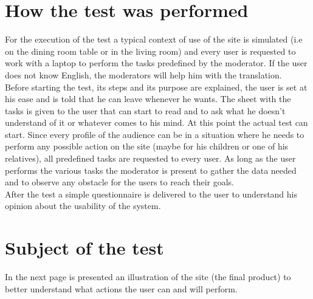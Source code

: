 \section{How the test was performed}
For the execution of the test a typical context of use of the site is simulated (i.e on the dining room table or in the living room) and every user is requested to work with a laptop to perform the tasks predefined by the moderator.
If the user does not know English, the moderators will help him with the translation.\\
Before starting the test, its steps and its purpose are explained, the user is set at his ease and is told that he can leave whenever he wants.
The sheet with the tasks is given to the user that can start to read and to ask what he doesn't understand of it or whatever comes to his mind. At this point the actual test can start. Since every profile of the audience can be in a situation where he needs to perform any possible action on the site (maybe for his children or one of his relatives), all predefined tasks are requested to every user. As long as the user performs the various tasks the moderator is present to gather the data needed and to observe any obstacle for the users to reach their goals.\\
After the test a simple questionnaire is delivered to the user to understand his opinion about the usability of the system.
%
%
\section{Subject of the test}
In the next page is presented an illustration of the site (the final product) to better understand what actions the user can and will perform.


%
